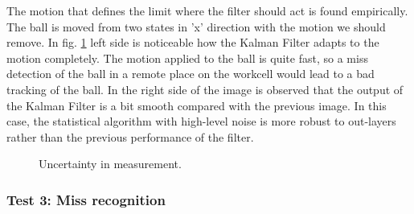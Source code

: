 The motion that defines the limit where the filter should act is found empirically. The ball is moved from two states in 'x' direction with the motion we should remove. In fig. \ref{fig:kf_uncertainty} left side is noticeable how the Kalman Filter adapts to the motion completely. The motion applied to the ball is quite fast, so a miss detection of the ball in a remote place on the workcell would lead to a bad tracking of the ball. In the right side of the image is observed that the output of the Kalman Filter is a bit smooth compared with the previous image. In this case, the statistical algorithm with high-level noise is more robust to out-layers rather than the previous performance of the filter.
\begin{figure}[ht!]
\centering
\captionsetup{justification=centering,margin=1cm}
\caption{Uncertainty in measurement.}
\label{fig:kf_uncertainty}
\end{figure}  
   
\newpage
\subsubsection{Test 3: Miss recognition}

